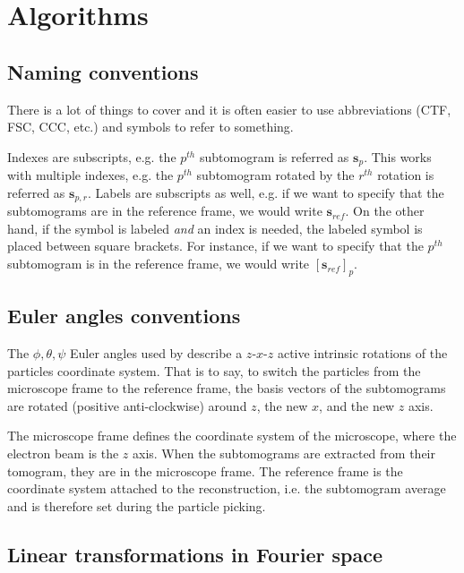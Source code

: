 \section{Algorithms} \label{sec:algo}

\subsection{Naming conventions} \label{sec:algo:naming_conventions}

There is a lot of things to cover and it is often easier to use abbreviations (CTF, FSC, CCC, etc.) and symbols to refer to something.



Indexes are subscripts, e.g. the $p^{th}$ subtomogram is referred as $\bm{s}_p$. This works with multiple indexes, e.g. the $p^{th}$ subtomogram rotated by the $r^{th}$ rotation is referred as $\bm{s}_{p,r}$. Labels are subscripts as well, e.g. if we want to specify that the subtomograms are in the reference frame, we would write $\bm{s}_{ref}$. On the other hand, if the symbol is labeled \emph{and} an index is needed, the labeled symbol is placed between square brackets. For instance, if we want to specify that the $p^{th}$ subtomogram is in the reference frame, we would write ${[\bm{s}_{ref}]}_p$.


\subsection{Euler angles conventions} \label{sec:algo:euler_conventions}

The $\phi, \theta, \psi$ Euler angles used by {\emClarity} describe a $z\text{-}x\text{-}z$ active intrinsic rotations of the particles coordinate system. That is to say, to switch the particles from the microscope frame to the reference frame, the basis vectors of the subtomograms are rotated (positive anti-clockwise) around $z$, the new $x$, and the new $z$ axis.

The microscope frame defines the coordinate system of the microscope, where the electron beam is the $z$ axis. When the subtomograms are extracted from their tomogram, they are in the microscope frame. The reference frame is the coordinate system attached to the reconstruction, i.e. the subtomogram average and is therefore set during the particle picking.


\subsection{Linear transformations in Fourier space}

